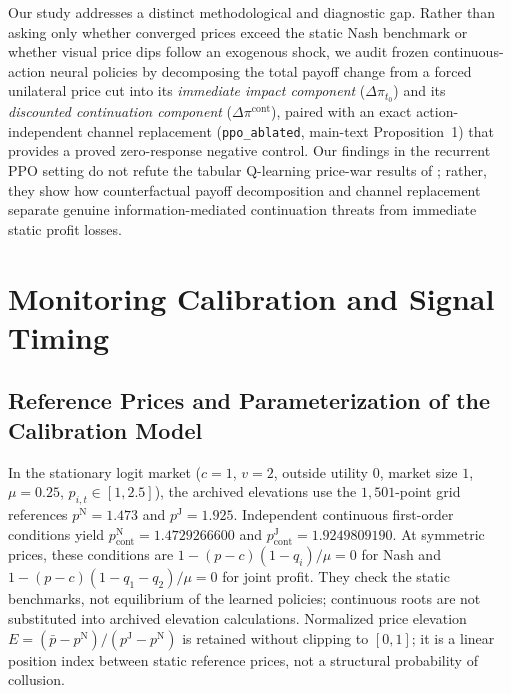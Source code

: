 \documentclass{article}
\begin{document}
Our study addresses a distinct methodological and diagnostic gap. Rather than asking only whether converged prices exceed the static Nash benchmark or whether visual price dips follow an exogenous shock, we audit frozen continuous-action neural policies by decomposing the total payoff change from a forced unilateral price cut into its \emph{immediate impact component} ($\Delta\pi_{t_0}$) and its \emph{discounted continuation component} ($\Delta\pi^{\mathrm{cont}}$), paired with an exact action-independent channel replacement (\texttt{ppo\_ablated}, main-text Proposition~1) that provides a proved zero-response negative control. Our findings in the recurrent PPO setting do not refute the tabular Q-learning price-war results of \citet{calvano2021algorithmic}; rather, they show how counterfactual payoff decomposition and channel replacement separate genuine information-mediated continuation threats from immediate static profit losses.

\section{Monitoring Calibration and Signal Timing}

\subsection{Reference Prices and Parameterization of the Calibration Model}

In the stationary logit market ($c=1$, $v=2$, outside utility $0$, market size $1$, $\mu=0.25$, $p_{i,t}\in[1,2.5]$), the archived elevations use the $1{,}501$-point grid references $p^{\mathrm{N}}=1.473$ and $p^{\mathrm{J}}=1.925$. Independent continuous first-order conditions yield $p^{\mathrm{N}}_{\mathrm{cont}}=1.4729266600$ and $p^{\mathrm{J}}_{\mathrm{cont}}=1.9249809190$. At symmetric prices, these conditions are $1-(p-c)(1-q_i)/\mu=0$ for Nash and $1-(p-c)(1-q_1-q_2)/\mu=0$ for joint profit. They check the static benchmarks, not equilibrium of the learned policies; continuous roots are not substituted into archived elevation calculations. Normalized price elevation $E = (\bar{p}-p^{\mathrm{N}})/(p^{\mathrm{J}}-p^{\mathrm{N}})$ is retained without clipping to $[0,1]$; it is a linear position index between static reference prices, not a structural probability of collusion.
\end{document}
